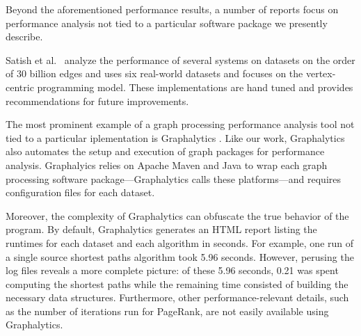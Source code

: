 \documentclass[conference]{IEEEtran}
\begin{document}
Beyond the aforementioned performance results, a number of reports focus on performance analysis not tied to a particular software package we presently describe.

Satish et al.~\cite{Satish:2014:NavigatingGraph} analyze the performance of several systems on datasets on the order of $30$ billion edges and \cite{Lu:2014:ExperimentalEval} uses six real-world datasets and focuses on the vertex-centric programming model. These implementations are hand tuned and provides recommendations for future improvements.

The most prominent example of a graph processing performance analysis tool not tied to a particular iplementation is Graphalytics \cite{Capota:2015:Graphalytics}. Like our work, Graphalytics also automates the setup and execution of graph packages for performance analysis. Graphalyics relies on Apache Maven and Java to wrap each graph processing software package---Graphalytics calls these platforms---and requires configuration files for each dataset.

Moreover, the complexity of Graphalytics can obfuscate the true behavior of the program. By default, Graphalytics generates an HTML report listing the runtimes for each dataset and each algorithm in seconds. For example, one run of a single source shortest paths algorithm took 5.96 seconds. However, perusing the log files reveals a more complete picture: of these 5.96 seconds, 0.21 was spent computing the shortest paths while the remaining time consisted of building the necessary data structures. Furthermore, other performance-relevant details, such as the number of iterations run for PageRank, are not easily available using Graphalytics.
\end{document}
